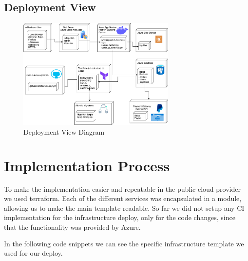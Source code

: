 \documentclass{llncs}
\begin{document}
\newpage
\subsection{Deployment View}

\begin{figure}[htbp]
    \begin{center}
        \includegraphics[width=0.7\textwidth]{../diagrams/deployment.png}
        \vspace{0.01\textwidth}
        \caption{Deployment View Diagram}
        \label{DeploymentView} %
    \end{center}
\end{figure}


\section{Implementation Process}

To make the implementation easier and repeatable in the public cloud provider we used terraform.
Each of the different services was encapsulated in a module, allowing us to make the main template readable.
So far we did not setup any CI implementation for the infrastructure deploy, only for the code changes, since that the functionality was provided by Azure.

In the following code snippets we can see the specific infrastructure template we used for our deploy.
\end{document}
